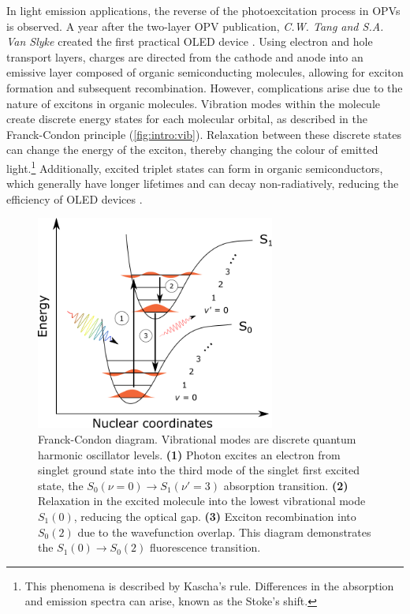 In light emission applications, the reverse of the photoexcitation process in \acp{OPV} is observed. A year after the two-layer \ac{OPV} publication, \emph{C.W. Tang and S.A. Van Slyke} created the first practical \ac{OLED} device \citep{Tang1987}. Using electron and hole transport layers, charges are directed from the cathode and anode into an emissive layer composed of organic semiconducting molecules, allowing for exciton formation and subsequent recombination. However, complications arise due to the nature of excitons in organic molecules. Vibration modes within the molecule create discrete energy states for each molecular orbital, as described in the Franck-Condon principle (\autoref{fig:intro:vib}). Relaxation between these discrete states can change the energy of the exciton, thereby changing the colour of emitted light.\footnote{This phenomena is described by Kascha's rule. Differences in the absorption and emission spectra can arise, known as the Stoke's shift.} Additionally, excited triplet states can form in organic semiconductors, which generally have longer lifetimes and can decay non-radiatively, reducing the efficiency of \ac{OLED} devices \citep{kohler2009triplet}. 

\begin{figure}[t]
    \centering
    \includegraphics[width=0.7\textwidth]{pictures/franck_condon_transitions.png}
    \caption{Franck-Condon diagram. Vibrational modes are discrete quantum harmonic oscillator levels. \textbf{(1)} Photon excites an electron from singlet ground state into the third mode of the singlet first excited state, the $S_0(\nu=0) \rightarrow S_1(\nu'=3)$ absorption transition. \textbf{(2)} Relaxation in the excited molecule into the lowest vibrational mode $S_1(0)$, reducing the optical gap. \textbf{(3)} Exciton recombination into $S_0(2)$ due to the wavefunction overlap. This diagram demonstrates the $S_1(0) \rightarrow S_0(2)$ fluorescence transition.}
    \label{fig:intro:vib}
\end{figure}



